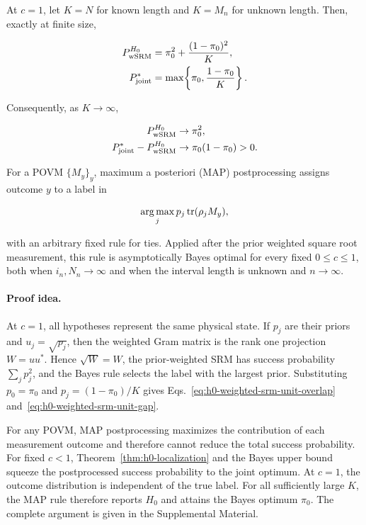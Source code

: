 \begin{proposition}
\label{prop:h0-unit-map}
At \(c=1\), let \(K=N\) for known length and \(K=M_n\) for unknown length.
Then, exactly at finite size,

\begin{equation}\label{eq:h0-weighted-srm-unit-overlap}
\begin{aligned}
P_{\rm wSRM}^{H_0}
&=\pi_0^2+\frac{(1-\pi_0)^2}{K},\\
P_{\rm joint}^*
&=\max\!\left\{\pi_0,\frac{1-\pi_0}{K}\right\}.
\end{aligned}
\end{equation}

Consequently, as \(K\to\infty\),

\begin{equation}\label{eq:h0-weighted-srm-unit-gap}
\begin{aligned}
P_{\rm wSRM}^{H_0}&\to\pi_0^2,\\
P_{\rm joint}^*-P_{\rm wSRM}^{H_0}
&\to\pi_0(1-\pi_0)>0.
\end{aligned}
\end{equation}

For a POVM \(\{M_y\}_y\), maximum a posteriori (MAP) postprocessing assigns
outcome \(y\) to a label in

\[
 \mathop{\rm arg\,max}_j
 p_j\operatorname{tr}(\rho_jM_y),
\]

with an arbitrary fixed rule for ties. Applied after the prior weighted
square root measurement, this rule is asymptotically Bayes optimal for every
fixed \(0\le c\le1\), both when \(i_n,N_n\to\infty\) and when the interval
length is unknown and \(n\to\infty\).
\end{proposition}

\paragraph{Proof idea.}
At \(c=1\), all hypotheses represent the same physical state. If \(p_j\) are
their priors and \(u_j=\sqrt{p_j}\), then the weighted Gram matrix is the rank
one projection \(W=uu^*\). Hence \(\sqrt W=W\), the prior-weighted SRM has
success probability \(\sum_jp_j^2\), and the Bayes rule selects the label with
the largest prior. Substituting \(p_0=\pi_0\) and
\(p_j=(1-\pi_0)/K\) gives
Eqs.~\eqref{eq:h0-weighted-srm-unit-overlap}
and~\eqref{eq:h0-weighted-srm-unit-gap}.

For any POVM, MAP postprocessing maximizes the contribution of each
measurement outcome and therefore cannot reduce the total success
probability. For fixed \(c<1\), Theorem~\ref{thm:h0-localization} and the
Bayes upper bound squeeze the postprocessed success probability to the joint
optimum. At \(c=1\), the outcome distribution is independent of the true
label. For all sufficiently large \(K\), the MAP rule therefore reports
\(H_0\) and attains the Bayes optimum \(\pi_0\). The complete argument is
given in the Supplemental Material.

